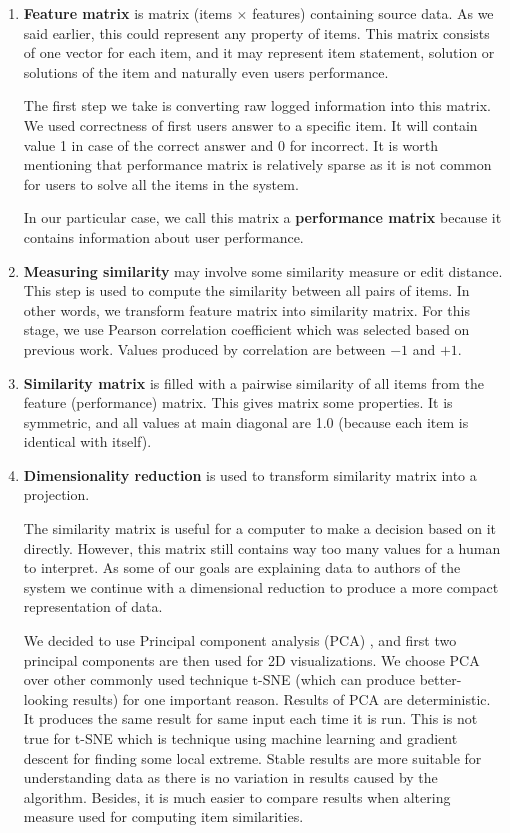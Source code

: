\documentclass[
  digital, %
  table,   %
  nolof,     %
  nolot,     %
  nocover,
  color,
  final, %
]{fithesis3}
\begin{document}
\begin{enumerate}
  \item
    \textbf{Feature matrix} is matrix (items $\times$ features) containing source data. As we said earlier, this could represent any property of items. This matrix consists of one vector for each item, and it may represent item statement, solution or solutions of the item and naturally even users performance.

    The first step we take is converting raw logged information into this matrix. We used correctness of first users answer to a specific item. It will contain value 1 in case of the correct answer and 0 for incorrect. It is worth mentioning that performance matrix is relatively sparse as it is not common for users to solve all the items in the system.

    In our particular case, we call this matrix a \textbf{performance matrix} because it contains information about user performance.

  \item
    \textbf{Measuring similarity} may involve some similarity measure or edit distance. This step is used to compute the similarity between all pairs of items. In other words, we transform feature matrix into similarity matrix. For this stage, we use Pearson correlation coefficient which was selected based on previous work. Values produced by correlation are between $-1$ and $+1$.

  \item
    \textbf{Similarity matrix} is filled with a pairwise similarity of all items from the feature (performance) matrix. This gives matrix some properties. It is symmetric, and all values at main diagonal are 1.0 (because each item is identical with itself).

  \item
    \textbf{Dimensionality reduction} is used to transform similarity matrix into a projection.


    The similarity matrix is useful for a computer to make a decision based on it directly. However, this matrix still contains way too many values for a human to interpret. As some of our goals are explaining data to authors of the system we continue with a dimensional reduction to produce a more compact representation of data.


    We decided to use Principal component analysis (PCA) \cite{wold1987principal}, and first two principal components are then used for 2D visualizations. We choose PCA over other commonly used technique t-SNE (which can produce better-looking results) for one important reason. Results of PCA are deterministic. It produces the same result for same input each time it is run. This is not true for t-SNE \cite{maaten2008visualizing} which is technique using machine learning and gradient descent for finding some local extreme. Stable results are more suitable for understanding data as there is no variation in results caused by the algorithm. Besides, it is much easier to compare results when altering measure used for computing item similarities.


\end{enumerate}
\end{document}

